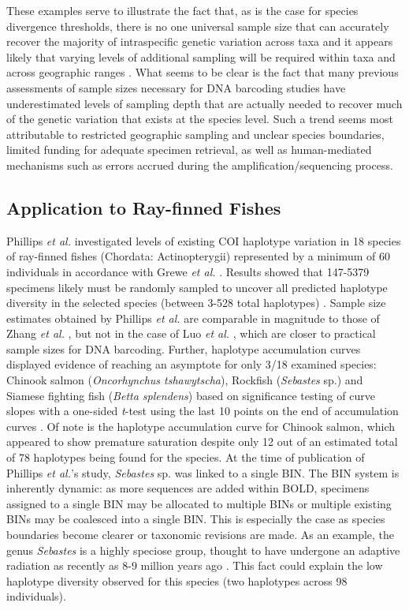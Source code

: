 These examples serve to illustrate the fact that, as is the case for species divergence thresholds, there is no one universal sample size that can accurately recover the majority of intraspecific genetic variation across taxa and it appears likely that varying levels of additional sampling will be required within taxa and across geographic ranges \cite{lou2012effect}. What seems to be clear is the fact that many previous assessments of sample sizes necessary for DNA barcoding studies have underestimated levels of sampling depth that are actually needed to recover much of the genetic variation that exists at the species level. Such a trend seems most attributable to restricted geographic sampling and unclear species boundaries, limited funding for adequate specimen retrieval, as well as human-mediated mechanisms such as errors accrued during the amplification/sequencing process. 

\subsection{Application to Ray-finned Fishes}

Phillips \textit{et al.} \cite{phillips2015exploration} investigated levels of existing COI haplotype variation in 18 species of ray-finned fishes (Chordata: Actinopterygii) represented by a minimum of 60 individuals in accordance with Grewe \textit{et al.} \cite{grewe1993mitochondrial}. Results showed that 147-5379 specimens likely must be randomly sampled to uncover all predicted haplotype diversity in the selected species (between 3-528 total haplotypes) \cite{phillips2015exploration}. Sample size estimates obtained by Phillips \textit{et al.} \cite{phillips2015exploration} are comparable in magnitude to those of Zhang \textit{et al.} \cite{zhang2010estimating}, but not in the case of Luo \textit{et al.} \cite{luo2015simulation}, which are closer to practical sample sizes for DNA barcoding. Further, haplotype accumulation curves displayed evidence of reaching an asymptote for only 3/18 examined species: Chinook salmon (\textit{Oncorhynchus tshawytscha}), Rockfish (\textit{Sebastes} sp.) and Siamese fighting fish (\textit{Betta splendens}) based on significance testing of curve slopes with a one-sided \textit{t}-test using the last 10 points on the end of accumulation curves \cite{phillips2015exploration}. Of note is the haplotype accumulation curve for Chinook salmon, which appeared to show premature saturation despite only 12 out of an estimated total of 78 haplotypes being found for the species. At the time of publication of Phillips \textit{et al.}'s \cite{phillips2015exploration} study, \textit{Sebastes} sp. was linked to a single BIN. The BIN system is inherently dynamic: as more sequences are added within BOLD, specimens assigned to a single BIN may be allocated to multiple BINs or multiple existing BINs may be coalesced into a single BIN. This is especially the case as species boundaries become clearer or taxonomic revisions are made. As an example, the genus \textit{Sebastes} is a highly speciose group, thought to have undergone an adaptive radiation as recently as 8-9 million years ago \cite{steinke2009dna}. This fact could explain the low haplotype diversity observed for this species (two haplotypes across 98 individuals).

